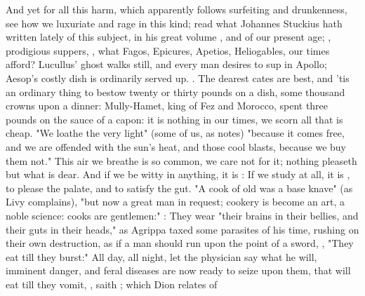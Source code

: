 And yet for all this harm, which apparently follows surfeiting and drunkenness,
see how we luxuriate and rage in this kind; read what Johannes Stuckius hath
written lately of this subject, in his great volume , and of our present age; , prodigious suppers, , what Fagos,
Epicures, Apetios, Heliogables, our times afford? Lucullus' ghost walks
still, and every man
desires to sup in Apollo; Aesop's costly dish is ordinarily served up.
. The dearest
cates are best, and 'tis an ordinary thing to bestow twenty or thirty pounds on
a dish, some thousand crowns upon a dinner: Mully-Hamet,
king of Fez and Morocco, spent three pounds on the sauce of a capon: it is
nothing in our times, we scorn all that is cheap. "We loathe the very
light" (some of us, as \Seneca{} notes) "because it comes
free, and we are offended with the sun's heat, and those cool blasts, because
we buy them not." This air we breathe is so common, we care not for it; nothing
pleaseth but what is dear. And if we be witty in anything,
it is : If we study at all, it is , to please the
palate, and to satisfy the gut. "A cook of old was a base knave" (as
Livy complains), "but now a great man in request; cookery
is become an art, a noble science: cooks are gentlemen:" : They
wear "their brains in their bellies, and their guts in their heads," as
Agrippa taxed some parasites of his time, rushing on their
own destruction, as if a man should run upon the point of a sword, , "They eat till they burst:" All
day, all night, let the physician say what he will, imminent danger, and feral
diseases are now ready to seize upon them, that will eat till they vomit,
, saith \Seneca{}; which Dion relates of
